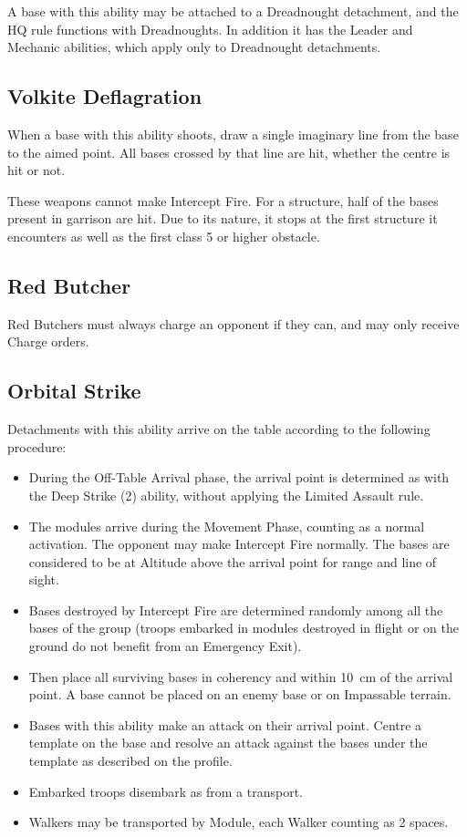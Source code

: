 A base with this ability may be attached to a Dreadnought detachment, and the HQ rule functions with Dreadnoughts. In addition it has the Leader and Mechanic abilities, which apply only to Dreadnought detachments.

\subsection{Volkite Deflagration}

When a base with this ability shoots, draw a single imaginary line from the base to the aimed point. All bases crossed by that line are hit, whether the centre is hit or not.

These weapons cannot make Intercept Fire. For a structure, half of the bases present in garrison are hit. Due to its nature, it stops at the first structure it encounters as well as the first class 5 or higher obstacle.

\subsection{Red Butcher}

Red Butchers must always charge an opponent if they can, and may only receive Charge orders.

\subsection{Orbital Strike}

Detachments with this ability arrive on the table according to the following procedure:

\begin{itemize}
    \item During the Off-Table Arrival phase, the arrival point is determined as with the Deep Strike (2) ability, without applying the Limited Assault rule.
    \item The modules arrive during the Movement Phase, counting as a normal activation. The opponent may make Intercept Fire normally. The bases are considered to be at Altitude above the arrival point for range and line of sight.
    \item Bases destroyed by Intercept Fire are determined randomly among all the bases of the group (troops embarked in modules destroyed in flight or on the ground do not benefit from an Emergency Exit).
    \item Then place all surviving bases in coherency and within 10~cm of the arrival point. A base cannot be placed on an enemy base or on Impassable terrain.
    \item Bases with this ability make an attack on their arrival point. Centre a template on the base and resolve an attack against the bases under the template as described on the profile.
    \item Embarked troops disembark as from a transport.
    \item Walkers may be transported by Module, each Walker counting as 2 spaces.
\end{itemize}

